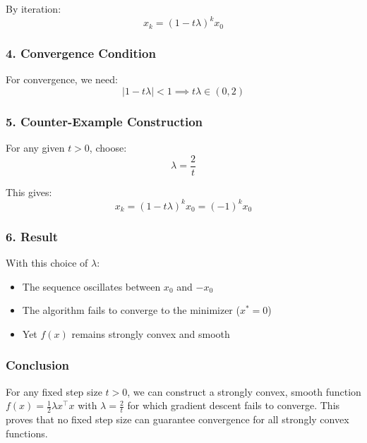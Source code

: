 \documentclass{article}
\begin{document}
By iteration:
\[x_k = (1 - t\lambda)^k x_0\]

\subsubsection*{4. Convergence Condition}
For convergence, we need:
\[|1 - t\lambda| < 1 \implies t\lambda \in (0, 2)\]

\subsubsection*{5. Counter-Example Construction}
For any given $t > 0$, choose:
\[\lambda = \frac{2}{t}\]

This gives:
\[x_k = (1 - t\lambda)^k x_0 = (-1)^k x_0\]

\subsubsection*{6. Result}
With this choice of $\lambda$:
\begin{itemize}
\item The sequence oscillates between $x_0$ and $-x_0$
\item The algorithm fails to converge to the minimizer ($x^* = 0$)
\item Yet $f(x)$ remains strongly convex and smooth
\end{itemize}

\subsubsection*{Conclusion}
For any fixed step size $t > 0$, we can construct a strongly convex, smooth function $f(x) = \frac{1}{2}\lambda x^\top x$ with $\lambda = \frac{2}{t}$ for which gradient descent fails to converge. This proves that no fixed step size can guarantee convergence for all strongly convex functions.
\end{document}
